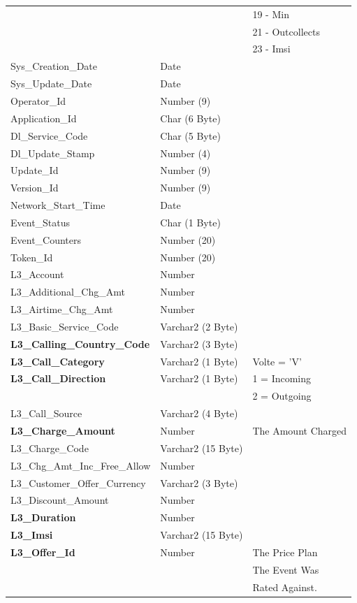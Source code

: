 \documentclass[12pt,twoside]{article}
\begin{document}
\begin{longtable}{l|l|l}
 &  & 19 - Min\\
 &  & 21 - Outcollects\\
 &  & 23 - Imsi\\
Sys\_Creation\_Date & Date & \\
Sys\_Update\_Date & Date & \\
Operator\_Id & Number (9) & \\
Application\_Id & Char (6 Byte) & \\
Dl\_Service\_Code & Char (5 Byte) & \\
Dl\_Update\_Stamp & Number (4) & \\
Update\_Id & Number (9) & \\
Version\_Id & Number (9) & \\
Network\_Start\_Time & Date & \\
Event\_Status & Char (1 Byte) & \\
Event\_Counters & Number (20) & \\
Token\_Id & Number (20) & \\
L3\_Account & Number & \\
L3\_Additional\_Chg\_Amt & Number & \\
L3\_Airtime\_Chg\_Amt & Number & \\
L3\_Basic\_Service\_Code & Varchar2 (2 Byte) & \\
\textbf{L3\_Calling\_Country\_Code} & Varchar2 (3 Byte) & \\
\textbf{L3\_Call\_Category} & Varchar2 (1 Byte) & Volte = 'V'\\
\textbf{L3\_Call\_Direction} & Varchar2 (1 Byte) & 1 = Incoming\\
 &  & 2 = Outgoing\\
L3\_Call\_Source & Varchar2 (4 Byte) & \\
\textbf{L3\_Charge\_Amount} & Number & The Amount Charged\\
L3\_Charge\_Code & Varchar2 (15 Byte) & \\
L3\_Chg\_Amt\_Inc\_Free\_Allow & Number & \\
L3\_Customer\_Offer\_Currency & Varchar2 (3 Byte) & \\
L3\_Discount\_Amount & Number & \\
\textbf{L3\_Duration} & Number & \\
\textbf{L3\_Imsi} & Varchar2 (15 Byte) & \\
\textbf{L3\_Offer\_Id} & Number & The Price Plan\\
 &  & The Event Was\\
 &  & Rated Against.\\

\end{longtable}
\end{document}
